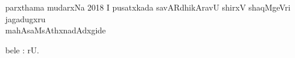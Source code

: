 \thispagestyle{empty}
\begin{center}
parxthama mudarxNa 2018
\vfill
I pusatxkada savARdhikAravU shirxV shaqMgeVri jagadugxru\\
mahAsaMsAthxnadAdxgide
\vfill

bele : rU.
\end{center}

